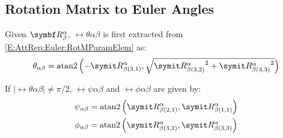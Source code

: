 \subsection{Rotation Matrix to Euler Angles} \label{S:AttRep:Conv:RotM2Euler}
Given $\RotM{\alpha}{\beta}$, $\rel{\theta}{\alpha}{\beta}$ is first extracted from \eqref{E:AttRep:Euler:RotMParamElem} as:
\begin{equation*}
	\rel{\theta}{\alpha}{\beta} = \atan2 \left( -\cRotM{\alpha}{\beta}{3,1}, \sqrt{{\cRotM{\alpha}{\beta}{3,2}}^2 + \cRotM{\alpha}{\beta}{3,3}^2} \right) 
\end{equation*}

If $|\rel{\theta}{\alpha}{\beta}| \neq \pi/2$, $\rel{\psi}{\alpha}{\beta}$ and $\rel{\phi}{\alpha}{\beta}$ are given by:
\begin{gather*}
	\rel{\psi}{\alpha}{\beta} = \atan2 \left( \cRotM{\alpha}{\beta}{2,1}, \cRotM{\alpha}{\beta}{1,1} \right) \\
	\rel{\phi}{\alpha}{\beta} = \atan2 \left( \cRotM{\alpha}{\beta}{3,2}, \cRotM{\alpha}{\beta}{3,3} \right)
\end{gather*}

